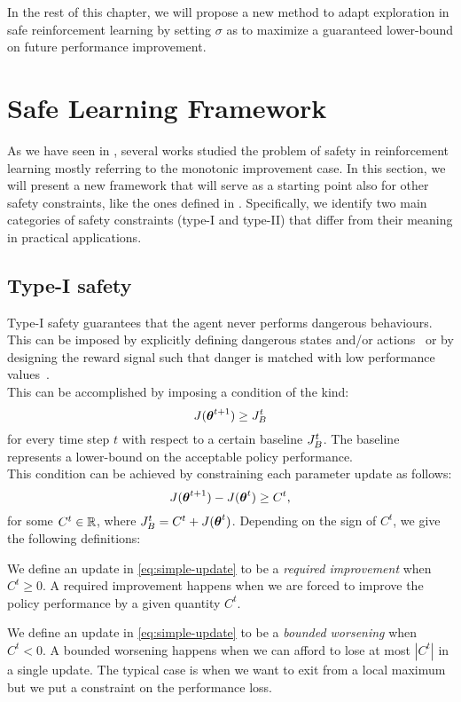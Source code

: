 In the rest of this chapter, we will propose a new method to adapt exploration in safe reinforcement learning by setting $\sigma$ as to maximize a guaranteed lower-bound on future performance improvement.


\section{Safe Learning Framework}\label{sec:framework}

As we have seen in , several works studied the problem of safety in reinforcement learning mostly referring to the monotonic improvement case. In this section, we will present a new framework that will serve as a starting point also for other safety constraints, like the ones defined in . Specifically, we identify two main categories of safety constraints (type-I and type-II) that differ from their meaning in practical applications. 

\subsection{Type-I safety} 
Type-I safety guarantees that the agent never performs dangerous behaviours. This can be imposed by explicitly defining dangerous states and/or actions~\cite{gehring2013smart} or by designing the reward signal such that danger is matched with low performance values~\cite{safe_iteration}\cite{trpo}\cite{Petrik:2016:SPI:3157096.3157354}.\\
This can be accomplished by imposing a condition of the kind:%
%
\begin{equation}
J(\vtheta^{t+1}) \geq \jbase
\end{equation}
for every time step $t$ with respect to a certain baseline $\jbase$. The baseline represents a lower-bound on the acceptable policy performance.\\
This condition can be achieved by constraining each parameter update as follows:
\begin{equation}\label{eq:simple-update}
J(\vtheta^{t+1}) - J(\vtheta^{t}) \geq C^t,
\end{equation}
for some $C^t\in \realspace$, where $\jbase[t]=C^t + J(\vtheta^t)$. Depending on the sign of $C^t$, we give the following definitions:
\begin{definition}\label{def:required-improvement}
We define an update in \ref{eq:simple-update} to be a \textit{required improvement} when $C^t \geq 0$. A required improvement happens when we are forced to improve the policy performance by a given quantity $C^t$.
\end{definition}
\begin{definition}\label{def:bounded-worsening}
We define an update in \ref{eq:simple-update} to be a \textit{bounded worsening} when $C^t < 0$. A bounded worsening happens when we can afford to lose at most $|C^t|$ in a single update. The typical case is when we want to exit from a local maximum but we put a constraint on the performance loss.
\end{definition}


